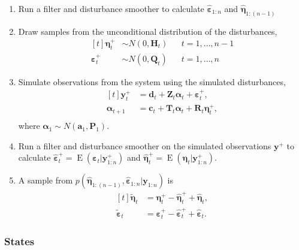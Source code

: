 \documentclass[]{book}
\providecommand{\tightlist}{%
  \setlength{\itemsep}{0pt}\setlength{\parskip}{0pt}}
\DeclareMathOperator{\E}{E}
\newcommand{\mat}[1]{\boldsymbol{#1}}
\renewcommand{\vec}[1]{\boldsymbol{#1}}
\begin{document}
\begin{enumerate}
\def\labelenumi{\arabic{enumi}.}
\tightlist
\item
  Run a filter and disturbance smoother to calculate
  \(\hat{\vec{\varepsilon}}_{1:n}\) and \(\hat{\vec{\eta}}_{1:(n - 1)}\)
\item
  Draw samples from the unconditional distribution of the disturbances,
  \[
  \begin{aligned}[t]
  \vec{\eta}^+_t &\sim N(0, \mat{H}_t) && t = 1, \dots, n - 1 \\
  \vec{\varepsilon}^+_t &\sim N(0, \mat{Q}_t) && t = 1, \dots, n
  \end{aligned}
  \]
\item
  Simulate observations from the system using the simulated
  disturbances, \[
  \begin{aligned}[t]
  \vec{y}^+_t &= \vec{d}_t + \mat{Z}_t \vec{\alpha}_t + \vec{\varepsilon}^+_t, \\
  \vec{\alpha}_{t + 1} &= \vec{c}_t + \mat{T}_t \vec{\alpha}_t + \mat{R}_t \vec{\eta}^+_t, \\
  \end{aligned}
  \] where \(\vec{\alpha}_1 \sim N(\vec{a}_1, \mat{P}_1)\).
\item
  Run a filter and disturbance smoother on the simulated observations
  \(\vec{y}^+\) to calculate
  \(\hat{\vec{\varepsilon}}_t^+ = \E(\vec{\varepsilon}_t | \vec{y}^+_{1:n})\)
  and \(\hat{\vec{\eta}}_t^+ = \E(\vec{\eta}_t | \vec{y}^+_{1:n})\).
\item
  A sample from
  \(p(\hat{\vec{\eta}}_{1:(n - 1)}, \hat{\vec{\varepsilon}}_{1:n} | \vec{y}_{1:n})\)
  is \[
  \begin{aligned}[t]
  \tilde{\vec{\eta}}_t &= \vec{\eta}^+_t - \hat{\vec{\eta}}^+_t + \hat{\vec{\eta}}_t , \\
  \tilde{\vec{\varepsilon}}_t &= \vec{\varepsilon}^+_t - \hat{\vec{\varepsilon}}^+_t + \hat{\vec{\varepsilon}}_t .
  \end{aligned}
  \]
\end{enumerate}

\subsubsection{States}\label{states}
\end{document}
